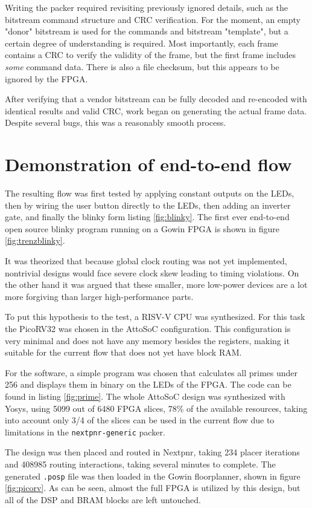 \documentclass{article}
\begin{document}
Writing the packer required revisiting previously ignored details, such as the bitstream command structure and CRC verification. For the moment, an empty "donor" bitstream is used for the commands and bitstream "template", but a certain degree of understanding is required. Most importantly, each frame contains a CRC to verify the validity of the frame, but the first frame includes \textit{some} command data. There is also a file checksum, but this appears to be ignored by the FPGA.

After verifying that a vendor bitstream can be fully decoded and re-encoded with identical results and valid CRC, work began on generating the actual frame data. Despite several bugs, this was a reasonably smooth process.

\section{Demonstration of end-to-end flow}

The resulting flow was first tested by applying constant outputs on the LEDs, then by wiring the user button directly to the LEDs, then adding an inverter gate, and finally the blinky form listing \ref{fig:blinky}. The first ever end-to-end open source blinky program running on a Gowin FPGA is shown in figure \ref{fig:trenzblinky}.

It was theorized that because global clock routing was not yet implemented, nontrivial designs would face severe clock skew leading to timing violations. On the other hand it was argued that these smaller, more low-power devices are a lot more forgiving than larger high-performance parts.

To put this hypothesis to the test, a RISV-V CPU was synthesized. For this task the PicoRV32 was chosen in the AttoSoC configuration. This configuration is very minimal and does not have any memory besides the registers, making it suitable for the current flow that does not yet have block RAM.

For the software, a simple program was chosen that calculates all primes under 256 and displays them in binary on the LEDs of the FPGA. The code can be found in listing \ref{fig:prime}. The whole AttoSoC design was synthesized with Yosys, using 5099 out of  6480 FPGA slices, 78\% of the available resources, taking into account only 3/4 of the slices can be used in the current flow due to limitations in the \texttt{nextpnr-generic} packer.

The design was then placed and routed in Nextpnr, taking 234 placer iterations and 408985 routing interactions, taking several minutes to complete. The generated \texttt{.posp} file was then loaded in the Gowin floorplanner, shown in figure \ref{fig:picorv}. As can be seen, almost the full FPGA is utilized by this design, but all of the DSP and BRAM blocks are left untouched.
\end{document}
